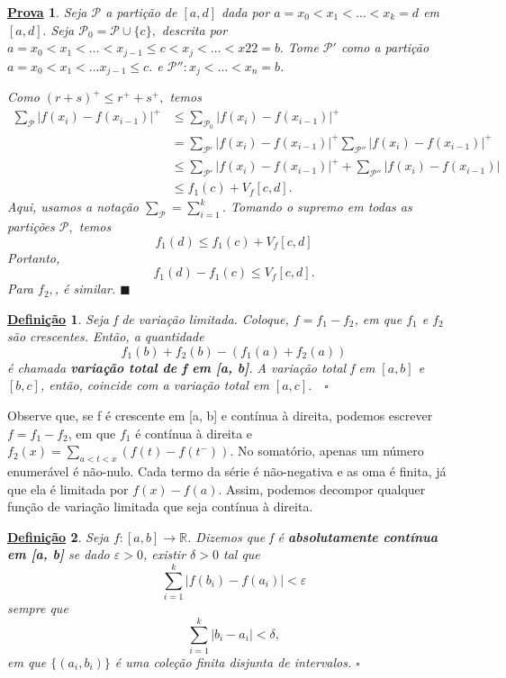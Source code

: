 \documentclass{article}
\newtheorem*{def*}{\underline{Defini\c c\~ao}}
\newtheorem*{proof*}{\underline{Prova}}
\renewcommand\qedsymbol{$\blacksquare$}
\begin{document}
\begin{proof*}
  Seja \(\mathcal{P}\) a partição de \([a, d]\) dada por \(a = x_{0} < x_1 < \dotsc < x_{k} = d\) em \([a, d].\) Seja \(\mathcal{P}_{0} = \mathcal{P}\cup \{c\},\) descrita por 
  \(a = x_{0} < x_1 < \dotsc < x_{j-1}\leq c < x_{j} < \dotsc <x22 = b.\) Tome \(\mathcal{P}'\) como a partição \(a = x_{0} < x_1 <\dotsc x_{j-1}\leq c\). 
  e \(\mathcal{P}'': x_{j} < \dotsc < x_{n}=b\).
    
Como \((r+s)^{+} \leq r^{+} + s^{+}, \) temos
 \begin{align*}
   \sum\limits_{\mathcal{P}}^{}|f(x_{i}) - f(x_{i-1})|^{+} &\leq \sum\limits_{\mathcal{P}_{0}}^{}|f(x_{i}) - f(x_{i-1})|^{+} \\ 
                                                           &= \sum\limits_{\mathcal{P}'}^{}|f(x_{i}) - f(x_{i-1})|^{+}\sum\limits_{\mathcal{P}''}^{}|f(x_{i}) - f(x_{i-1})|^{+}\\ 
                                                           &\leq \sum\limits_{\mathcal{P}'}^{}|f(x_{i})-f(x_{i-1})|^{+} + \sum\limits_{\mathcal{P}''}^{}|f(x_{i}) - f(x_{i-1})|\\ 
                                                           &\leq f_1(c) + V_f[c, d].
 \end{align*}
  Aqui, usamos a notação \(\sum\limits_{\mathcal{P}}^{} = \sum\limits_{i=1}^{k}.\) Tomando o supremo em todas as partições \(\mathcal{P},\) temos 
    \[
      f_1(d) \leq f_1(c) + V_f[c, d]
    \]
  Portanto, 
    \[
      f_1(d) - f_1(c) \leq V_f[c, d].
    \]
  Para \(f_2,\), é similar. \qedsymbol
\end{proof*}
 \begin{def*}
   Seja f de variação limitada. Coloque, \(f = f_1 - f_2\), em que \(f_1\) e \(f_2\) são crescentes. Então, a quantidade 
     \[
       f_1(b) + f_2(b) - (f_1(a) + f_2(a))
     \]
     é chamada \textbf{variação total de f em [a, b]}. A variação total f em \([a, b]\) e \([b, c]\), então, coincide com a variação total em \([a, c]. \quad \square\)
 \end{def*}
 Observe que, se f é crescente em [a, b] e contínua à direita, podemos escrever \(f = f_1 - f_2\), em que \(f_1\) é contínua à direita e \(f_2(x) = \sum\limits_{a < t < x}^{}(f(t) - f(t^{-})).\) No somatório, apenas um número enumerável é não-nulo. Cada termo da série é não-negativa e as oma é finita, já que ela é limitada por \(f(x)-f(a).\) Assim, podemos 
decompor qualquer função de variação limitada que seja contínua à direita.
 \begin{def*}
   Seja \(f:[a, b]\rightarrow \mathbb{R}\). Dizemos que f é \textbf{absolutamente contínua em [a, b]} se dado \(\varepsilon  > 0\), existir \(\delta  > 0\) tal que 
     \[
       \sum\limits_{i=1}^{k}|f(b_{i}) - f(a_{i})| < \varepsilon 
     \]
  sempre que 
    \[
      \sum\limits_{i=1}^{k}|b_{i} - a_{i}|  < \delta,
    \]
  em que \(\{(a_{i}, b_{i})\}\) é uma coleção finita disjunta de intervalos. \(\square\)
 \end{def*}
\end{document}
